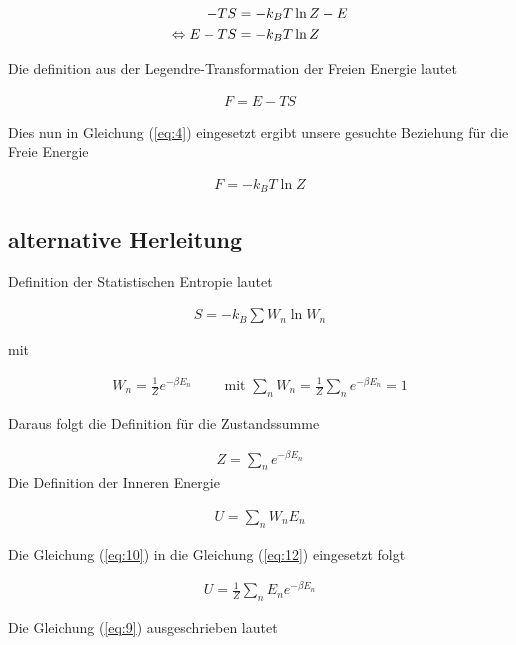 \begin{align}
  \label{eq:4}
  -TS &=  - k_B T \ln Z - E \notag \\
\Leftrightarrow E - TS &=  - k_B T \ln Z
\end{align}

Die definition aus der Legendre-Transformation der Freien Energie lautet

\begin{align}
  \label{eq:5}
  F = E - TS
\end{align}

Dies nun in Gleichung (\ref{eq:4}) eingesetzt ergibt unsere gesuchte Beziehung für die Freie Energie

\begin{align}
  \label{eq:6}
\boxed{  F =  - k_B T \ln Z }
\end{align}


\subsection*{alternative Herleitung}

Definition der Statistischen Entropie lautet

\begin{align}
  \label{eq:9}
  S = - k_B\sum W_n \ln W_n
\end{align}

mit

\begin{align}
  \label{eq:10}
  W_n = \frac{1}{Z}e^{-\beta E_n}\qquad \text{ mit } \sum_n W_n = \frac{1}{Z}\sum_ne^{-\beta E_n} = 1
\end{align}

Daraus folgt die Definition für die Zustandssumme

\begin{align}
  \label{eq:11}
  Z = \sum_n e^{-\beta E_n}
\end{align}
Die Definition der Inneren Energie

\begin{align}
  \label{eq:12}
  U = \sum_n W_n E_n
\end{align}

Die Gleichung (\ref{eq:10}) in die Gleichung (\ref{eq:12}) eingesetzt folgt

\begin{align}
  \label{eq:13}
  U = \frac{1}{Z}\sum_n E_ne^{-\beta E_n}
\end{align}

Die Gleichung (\ref{eq:9}) ausgeschrieben lautet

